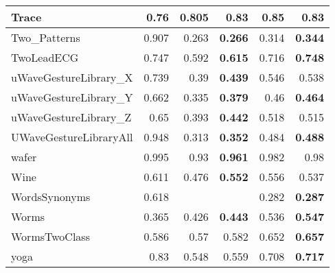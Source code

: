 \begin{longtable}[c]{|l||r||r|r||r|r|}
\hline
\rowcolor[rgb]{ .851,  .851,  .851} Trace &
0.76 &
0.805 &
\cellcolor[rgb]{ .973,  .796,  .678} \textbf{0.83} &
0.85 &
0.83
\bigstrut\\
\hline
Two\_Patterns &
0.907 &
0.263 &
\cellcolor[rgb]{ .973,  .796,  .678} \textbf{0.266} &
0.314 &
\cellcolor[rgb]{ .973,  .796,  .678} \textbf{0.344}
\bigstrut\\
\hline
\rowcolor[rgb]{ .851,  .851,  .851} TwoLeadECG &
0.747 &
0.592 &
\cellcolor[rgb]{ .973,  .796,  .678} \textbf{0.615} &
0.716 &
\cellcolor[rgb]{ .973,  .796,  .678} \textbf{0.748}
\bigstrut\\
\hline
uWaveGestureLibrary\_X &
0.739 &
0.39 &
\cellcolor[rgb]{ .973,  .796,  .678} \textbf{0.439} &
0.546 &
0.538
\bigstrut\\
\hline
\rowcolor[rgb]{ .851,  .851,  .851} uWaveGestureLibrary\_Y &
0.662 &
0.335 &
\cellcolor[rgb]{ .973,  .796,  .678} \textbf{0.379} &
0.46 &
\cellcolor[rgb]{ .973,  .796,  .678} \textbf{0.464}
\bigstrut\\
\hline
uWaveGestureLibrary\_Z &
0.65 &
0.393 &
\cellcolor[rgb]{ .973,  .796,  .678} \textbf{0.442} &
0.518 &
0.515
\bigstrut\\
\hline
\rowcolor[rgb]{ .851,  .851,  .851} UWaveGestureLibraryAll &
0.948 &
0.313 &
\cellcolor[rgb]{ .973,  .796,  .678} \textbf{0.352} &
0.484 &
\cellcolor[rgb]{ .973,  .796,  .678} \textbf{0.488}
\bigstrut\\
\hline
wafer &
0.995 &
0.93 &
\cellcolor[rgb]{ .973,  .796,  .678} \textbf{0.961} &
0.982 &
0.98
\bigstrut\\
\hline
\rowcolor[rgb]{ .851,  .851,  .851} Wine &
0.611 &
0.476 &
\cellcolor[rgb]{ .973,  .796,  .678} \textbf{0.552} &
0.556 &
0.537
\bigstrut\\
\hline
WordsSynonyms &
0.618 &
&
&
0.282 &
\cellcolor[rgb]{ .973,  .796,  .678} \textbf{0.287}
\bigstrut\\
\hline
\rowcolor[rgb]{ .851,  .851,  .851} Worms &
0.365 &
0.426 &
\cellcolor[rgb]{ .973,  .796,  .678} \textbf{0.443} &
0.536 &
\cellcolor[rgb]{ .973,  .796,  .678} \textbf{0.547}
\bigstrut\\
\hline
WormsTwoClass &
0.586 &
0.57 &
0.582 &
0.652 &
\cellcolor[rgb]{ .973,  .796,  .678} \textbf{0.657}
\bigstrut\\
\hline
\rowcolor[rgb]{ .851,  .851,  .851} yoga &
0.83 &
0.548 &
0.559 &
0.708 &
\cellcolor[rgb]{ .973,  .796,  .678} \textbf{0.717}
\bigstrut\\
\hline
\end{longtable}%

